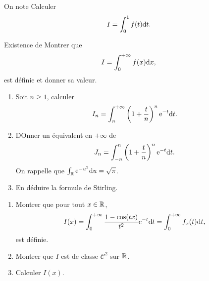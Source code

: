 \begin{exercise}
    On note \function{f}{]0,1]}{\R}{t}{\frac{1}{t}-\left\lfloor\frac{1}{t}\right\rfloor}
    Calculer 
    \begin{equation}
        I=\int_{0}^{1}f(t)\mathrm{d} t.
    \end{equation}
\end{exercise}

\begin{exercise}
    Existence de 
    Montrer que 
    \begin{equation}
        I=\int_{0}^{+\infty}f(x)\mathrm{d} x,
    \end{equation}
    est définie et donner sa valeur.
\end{exercise}

\begin{exercise}
    \phantom{}
    \begin{enumerate}
        \item Soit $n\geqslant1$, calculer 
        \begin{equation}
            I_n=\int_{n}^{+\infty}\left(1+\frac{t}{n}\right)^{n}\mathrm{e}^{-t}\mathrm{d} t.
        \end{equation}
        \item DOnner un équivalent en $+\infty$ de 
        \begin{equation}
            J_n=\int_{-n}^{n}\left(1+\frac{t}{n}\right)^{n}\mathrm{e}^{-t}\mathrm{d} t.
        \end{equation}
        On rappelle que $\int_{\mathbb{R}}\mathrm{e}^{-u^{2}}\mathrm{d} u=\sqrt{\pi}$.

        \item En déduire la formule de Stirling.
    \end{enumerate}
\end{exercise}

\begin{exercise}
    \phantom{}
    \begin{enumerate}
        \item Montrer que pour tout $x\in\mathbb{R}$, 
        \begin{equation}
            I(x)=\int_{0}^{+\infty}\frac{1-\cos(tx)}{t^{2}}\mathrm{e}^{-t}\mathrm{d} t=\int_{0}^{+\infty}f_x(t)\mathrm{d} t,
        \end{equation}
        est définie.
        \item Montrer que $I$ est de classe $\mathcal{C}^{2}$ sur $\mathbb{R}$.
        \item Calculer $I(x)$.
    \end{enumerate}
\end{exercise}

